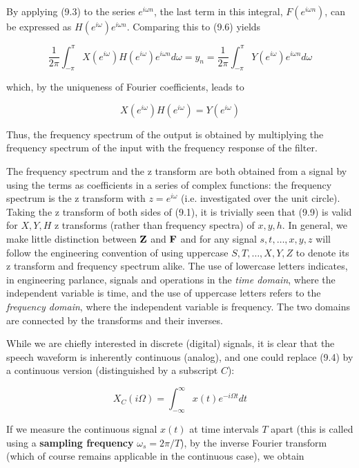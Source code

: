 \noindent
By applying (9.3) to the series $e^{i\omega n}$, the last term in 
this integral, $F(e^{i\omega
  n})$, can be expressed as $H(e^{i\omega})e^{i\omega n}$. Comparing this 
to (9.6) yields 

\begin{equation}
\frac{1}{2\pi}\int_{-\pi}^{\pi}X(e^{i\omega})H(e^{i\omega})e^{i\omega n}d\omega=y_n=\frac{1}{2\pi}\int_{-\pi}^{\pi}Y(e^{i\omega})e^{i\omega n}d\omega
\end{equation}

\noindent
which, by the uniqueness of Fourier coefficients, leads to

\begin{equation}
X(e^{i\omega})H(e^{i\omega})=Y(e^{i\omega})
\end{equation}

\noindent
Thus, the frequency spectrum of the output is obtained by multiplying the
frequency spectrum of the input with the frequency response of the filter.

The frequency spectrum and the z transform are both obtained from a signal by
using the terms as coefficients in a series of complex functions: the
frequency spectrum is the z transform with $z=e^{i\omega}$ (i.e. investigated
over the unit circle). Taking the z transform of both sides of (9.1), it is
trivially seen that (9.9) is valid for $X,Y,H$ z transforms (rather than
frequency spectra) of $x,y,h$. In general, we make little distinction between
${\bf Z}$ and ${\bf F}$ and for any signal $s,t,\ldots,x,y,z$ will follow the
engineering convention of using uppercase $S,T,\ldots,X,Y,Z$ to denote its z
transform and frequency spectrum alike. The use of lowercase letters
indicates, in engineering parlance, signals and operations in the {\it time
  domain}, where the independent variable is time, and the use of uppercase
letters refers to the {\it frequency domain}, where the independent variable
is frequency. The two domains are connected by the transforms and their
inverses. 

While we are chiefly interested in discrete (digital) signals, it is clear
that the speech waveform is inherently continuous (analog), and one could 
replace (9.4) by a continuous version (distinguished by a subscript $C$):

\begin{equation}
X_C(i\Omega)=\int_{-\infty}^{\infty}x(t)e^{-i\Omega t}dt
\end{equation}

\noindent
If we measure the continuous signal $x(t)$ at time intervals $T$ apart (this
is called using a {\bf sampling frequency} $\omega_s = 2\pi/T$), by the inverse
Fourier transform (which of course remains applicable in the continuous case),
we obtain

